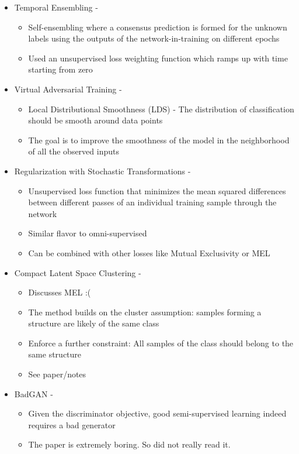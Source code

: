 \begin{itemize}
	\item Temporal Ensembling - \cite{Laine2016}
	\begin{itemize}
		\item Self-ensembling where a consensus prediction is formed for the unknown labels using the
			outputs of the network-in-training on different epochs
		\item Used an unsupervised loss weighting function which ramps up with time starting from zero
	\end{itemize}
	
	\item Virtual Adversarial Training - \cite{Miyato2017}
	\begin{itemize}
		\item Local Distributional Smoothness (LDS) - The distribution of classification should be
			smooth around data points
		\item The goal is to improve the smoothness of the model in the neighborhood of all the observed
			inputs
	\end{itemize}
	
	\item Regularization with Stochastic Transformations - \cite{Sajjadi2016a}
	\begin{itemize}
		\item Unsupervised loss function that minimizes the mean squared differences between different
			passes of an individual training sample through the network
		\item Similar flavor to omni-supervised
		\item Can be combined with other losses like Mutual Exclusivity or MEL
	\end{itemize}
	
	\item Compact Latent Space Clustering - \cite{Kamnitsas2018}
	\begin{itemize}
		\item Discusses MEL :(
		\item The method builds on the cluster assumption: samples forming a structure are likely of the
			same class
		\item Enforce a further constraint: All samples of the class should belong to the same structure
		\item See paper/notes
	\end{itemize}
	
	\item BadGAN - \cite{Dai2017}
	\begin{itemize}
		\item Given the discriminator objective, good semi-supervised learning indeed requires a bad
			generator
		\item The paper is extremely boring. So did not really read it. 
	\end{itemize}
	

\end{itemize}
